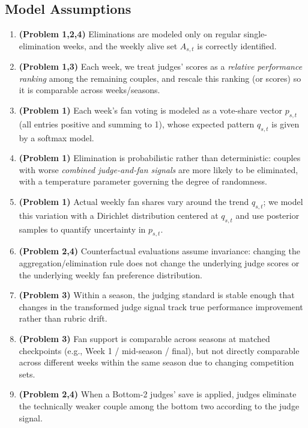 \documentclass[12pt]{article}
\begin{document}
\subsection{Model Assumptions}
\begin{enumerate}
	\setlength{\parsep}{0ex} %
	\setlength{\topsep}{2ex} %
	\setlength{\itemsep}{1ex} %
	
	\item \textbf{(Problem 1,2,4)}  Eliminations are modeled only on regular single-elimination weeks, and the weekly alive set $A_{s,t}$ is correctly identified.
	
	\item \textbf{(Problem 1,3)} Each week, we treat judges' scores as a \emph{relative performance ranking} among the remaining couples, and rescale this ranking (or scores) so it is comparable across weeks/seasons.
	
	\item \textbf{(Problem 1)} Each week’s fan voting is modeled as a vote-share vector $p_{s,t}$ (all entries positive and summing to 1), whose expected pattern $q_{s,t}$ is given by a softmax model.
	
	\item \textbf{(Problem 1)} Elimination is probabilistic rather than deterministic: couples with worse \emph{combined judge-and-fan signals} are more likely to be eliminated, with a temperature parameter governing the degree of randomness.
	
	
	\item \textbf{(Problem 1)} Actual weekly fan shares vary around the trend $q_{s,t}$; we model this variation with a Dirichlet distribution centered at $q_{s,t}$ and use posterior samples to quantify uncertainty in $p_{s,t}$.
	
	\item \textbf{(Problem 2,4)} Counterfactual evaluations assume invariance: changing the aggregation/elimination rule does not change the underlying judge scores or the underlying weekly fan preference distribution.
	
	\item \textbf{(Problem 3)} Within a season, the judging standard is stable enough that changes in the transformed judge signal track true performance improvement rather than rubric drift.
	
	\item \textbf{(Problem 3)} Fan support is comparable across seasons at matched checkpoints (e.g., Week 1 / mid-season / final), but not directly comparable across different weeks within the same season due to changing competition sets.
	
	\item \textbf{(Problem 2,4)} When a Bottom-2 judges' save is applied, judges eliminate the technically weaker couple among the bottom two according to the judge signal.
\end{enumerate}
\end{document}
